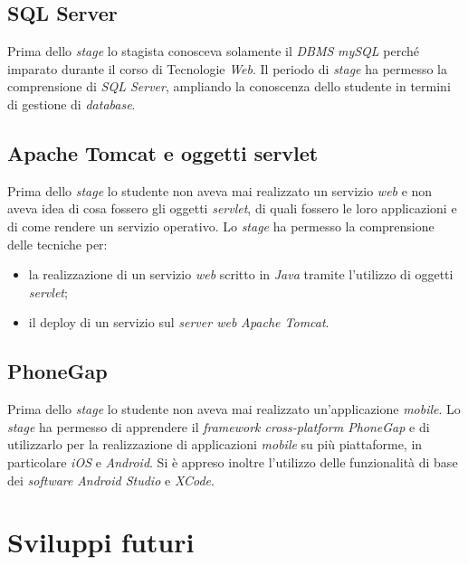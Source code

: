\subsection{SQL Server}

Prima dello \textit{stage} lo stagista conosceva solamente il \textit{DBMS} \textit{mySQL} perché imparato durante il corso di Tecnologie \textit{Web}. Il periodo di \textit{stage} ha permesso la comprensione di \textit{SQL Server}, ampliando la conoscenza dello studente in termini di gestione di \textit{database}.

\subsection{Apache Tomcat e oggetti servlet}

Prima dello \textit{stage} lo studente non aveva mai realizzato un servizio \textit{web} e non aveva idea di cosa fossero gli oggetti \textit{servlet}, di quali fossero le loro applicazioni e di come rendere un servizio operativo. Lo \textit{stage} ha permesso la comprensione delle tecniche per:
\begin{itemize}
	\item la realizzazione di un servizio \textit{web} scritto in \textit{Java} tramite l'utilizzo di oggetti \textit{servlet};
	\item il deploy di un servizio sul \textit{server web} \textit{Apache Tomcat}.
\end{itemize}

\subsection{PhoneGap}

Prima dello \textit{stage} lo studente non aveva mai realizzato un'applicazione \textit{mobile}. Lo \textit{stage} ha permesso di apprendere il \textit{framework cross-platform PhoneGap} e di utilizzarlo per la realizzazione di applicazioni \textit{mobile} su più piattaforme, in particolare \textit{iOS} e \textit{Android}. Si è appreso inoltre l'utilizzo delle funzionalità di base dei \textit{software} \textit{Android Studio} e \textit{XCode}.

\section{Sviluppi futuri}

